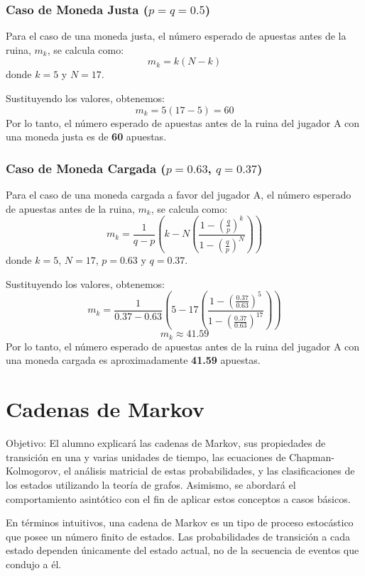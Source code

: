 \documentclass{article}
\begin{document}
\subsubsection*{Caso de Moneda Justa (\(p = q = 0.5\))}
Para el caso de una moneda justa, el número esperado de apuestas antes de la ruina, \(m_k\), se calcula como:
\[ m_k = k(N-k) \]
donde \(k = 5\) y \(N = 17\).

Sustituyendo los valores, obtenemos:
\[ m_k = 5(17-5) = 60 \]
Por lo tanto, el número esperado de apuestas antes de la ruina del jugador A con una moneda justa es de \textbf{60} apuestas.

\subsubsection*{Caso de Moneda Cargada (\(p = 0.63\), \(q = 0.37\))}
Para el caso de una moneda cargada a favor del jugador A, el número esperado de apuestas antes de la ruina, \(m_k\), se calcula como:
\[ m_k = \frac{1}{q-p}\left( k - N\left(\frac{1-\left(\frac{q}{p}\right)^k}{1-\left(\frac{q}{p}\right)^N}\right) \right) \]
donde \(k = 5\), \(N = 17\), \(p = 0.63\) y \(q = 0.37\).

Sustituyendo los valores, obtenemos:
\[ m_k = \frac{1}{0.37-0.63}\left( 5 - 17\left(\frac{1-\left(\frac{0.37}{0.63}\right)^5}{1-\left(\frac{0.37}{0.63}\right)^{17}}\right) \right) \]
\[ m_k \approx 41.59 \]
Por lo tanto, el número esperado de apuestas antes de la ruina del jugador A con una moneda cargada es aproximadamente \textbf{41.59} apuestas.

\newpage

\section{Cadenas de Markov}

Objetivo: El alumno explicará las cadenas de Markov, sus propiedades de transición en una y varias unidades de tiempo, las ecuaciones de Chapman-Kolmogorov, el análisis matricial de estas probabilidades, y las clasificaciones de los estados utilizando la teoría de grafos. Asimismo, se abordará el comportamiento asintótico con el fin de aplicar estos conceptos a casos básicos.

\vspace{.25cm}

En términos intuitivos, una cadena de Markov es un tipo de proceso estocástico que posee un número finito de estados. Las probabilidades de transición a cada estado dependen únicamente del estado actual, no de la secuencia de eventos que condujo a él.
\end{document}
